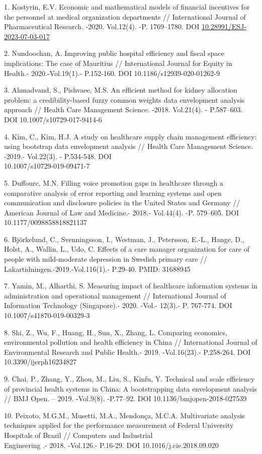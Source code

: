 \begin{references}
1. Kostyrin, E.V. Economic and mathematical models of financial
incentives for the personnel at medical organization departments //
International Journal of Pharmaceutical Research. -2020. Vol.12(4). -P.
1769--1780. DOI
\href{https://doi.org/10.28991/ESJ-2023-07-03-017}{10.28991/ESJ-2023-07-03-017}

2. Nundoochan, A. Improving public hospital efficiency and fiscal space
implications: The case of Mauritius // International Journal for Equity
in Health.- 2020.-Vol.19(1).- P.152-160. DOI 10.1186/s12939-020-01262-9

3. Ahmadvand, S., Pishvaee, M.S. An efficient method for kidney
allocation problem: a credibility-based fuzzy common weights data
envelopment analysis approach // Health Care Management Science. -2018.
Vol.21(4). - P.587--603. DOI 10.1007/s10729-017-9414-6

4. Kim, C., Kim, H.J. A study on healthcare supply chain management
efficiency: using bootstrap data envelopment analysis // Health Care
Management Science. -2019.- Vol.22(3). - P.534-548. DOI\\
10.1007/s10729-019-09471-7

5. Duffourc, M.N. Filling voice promotion gaps in healthcare through a
comparative analysis of error reporting and learning systems and open
communication and disclosure policies in the United States and Germany
// American Journal of Law and Medicine.- 2018.- Vol.44(4). -P.
579--605. DOI \\10.1177/0098858818821137

6. Björkelund, C., Svenningsson, I., Westman, J., Petersson, E.-L.,
Hange, D., Holst, A., Wallin, L., Udo, C. Effects of a care manager
organization for care of people with mild-moderate depression in Swedish
primary care // Lakartidningen.-2019.-Vol.116(1).- P.29-40. PMID:
31688945

7. Yamin, M., Alharthi, S. Measuring impact of healthcare information
systems in administration and operational management // International
Journal of Information Technology (Singapore).- 2020. -Vol.- 12(3).- P.
767-774. DOI 10.1007/s41870-019-00329-3

8. Shi, Z., Wu, F., Huang, H., Sun, X., Zhang, L. Comparing economics,
environmental pollution and health efficiency in China // International
Journal of Environmental Research and Public Health.- 2019.
-Vol.16(23).- P.258-264. DOI 10.3390/ijerph16234827

9. Chai, P., Zhang, Y., Zhou, M., Liu, S., Kinfu, Y. Technical and scale
efficiency of provincial health systems in China: A bootstrapping data
envelopment analysis // BMJ Open. -- 2019. -Vol.9(8). -P.77--92. DOI
10.1136/bmjopen-2018-027539

10. Peixoto, M.G.M., Musetti, M.A., Mendonça, M.C.A. Multivariate
analysis techniques applied for the performance measurement of Federal
University Hospitals of Brazil // Computers and Industrial \\Engineering .-
2018. -Vol.126.- P.16-29. DOI 10.1016/j.cie.2018.09.020
\end{references}

